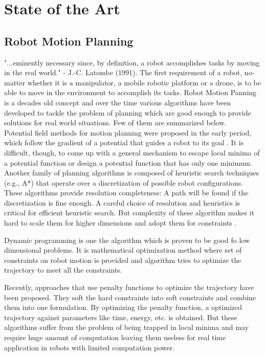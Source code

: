 
\chapter{State of the Art}

\section{Robot Motion Planning}
  
"...eminently necessary since, by definition, a robot accomplishes tasks by moving in the real world." - J.-C. Latombe (1991). The first requirement of a robot, no-matter whether it is a manipulator, a mobile robotic platform or a drone, is to be able to move in the environment to accomplish its tasks. Robot Motion Panning is a decades old concept and over the time various algorithms have been developed to tackle the problem of planning which are good enough to provide  solutions for real world situations. Few of them are summarized below.\\
Potential field methods for motion planning were proposed in the early period, which follow the gradient of a potential that guides a robot to its goal \cite{khatib1986real}. It is difficult, though, to come up with a general mechanism to escape local minima of a potential function or design a potential function that has only one minimum. \\
Another family of planning algorithms is composed of heuristic search techniques (e.g., A*) that operate over a discretization of possible robot configurations. These algorithms provide resolution completeness: A path will be found if the discretization is fine enough. A careful choice of resolution and heuristics is critical for efficient heuristic search. But complexity of these algorithm makes it hard to scale them for higher dimensions and adopt them for constraints \cite{kingston2018sampling}. 

Dynamic programming is one the algorithm which is proven to be good fo low dimensional problems. It is mathematical optimization method where set of constraints on robot motion is provided and algorithm tries to optimize the trajectory to meet all the constraints. 

Recently, approaches that use penalty functions to optimize the trajectory have been proposed. They soft the hard constraints into soft constraints and combine them into one formulation. By optimizing the penalty function, a optimized trajectory against parameters like time, energy, etc. is obtained. But these algorithms suffer from the problem of being trapped in local minima and may require huge amount of computation leaving them useless for real time application in robots with limited computation power\cite{kingston2018sampling}.
  
